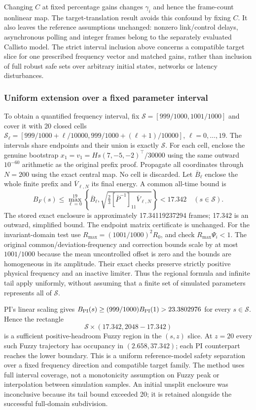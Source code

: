 Changing $C$ at fixed percentage gains changes $\gamma_i$ and hence
the frame-count nonlinear map. The target-translation result avoids
this confound by fixing $C$. It also leaves the reference assumptions
unchanged: nonzero link/control delays, asynchronous polling and
integer frames belong to the separately evaluated Callisto model.
The strict interval inclusion above concerns a compatible target
slice for one prescribed frequency vector and matched gains, rather
than inclusion of full robust safe sets over arbitrary initial
states, networks or latency disturbances.

\subsubsection{Uniform extension over a fixed parameter interval}
To obtain a quantified frequency interval, fix
$\mathcal S=[999/1000,1001/1000]$ and cover it with 20 closed cells
$\mathcal S_\ell=[999/1000+\ell/10000,
999/1000+(\ell+1)/10000]$, $\ell=0,\ldots,19$.
The intervals share endpoints and their union is exactly $\mathcal S$.
For each cell, enclose the genuine bootstrap
$x_1=v_1=Hs(7,-5,-2)^\top/30000$ using the same outward
$10^{-60}$ arithmetic as the original prefix proof. Propagate all
coordinates through $N=200$ using the exact central map. No cell is
discarded. Let $\overline B_\ell$ enclose the whole finite prefix
and $\overline V_{\ell,N}$ its final energy. A common all-time bound is
\begin{equation}
 B_F(s)\le\max_{\ell=0}^{19}
 \left\{\overline B_\ell,
 \sqrt{\tfrac23[\bar P^{-1}]_{11}\overline V_{\ell,N}}\right\}
 <17.342\quad(s\in\mathcal S).
 \label{detail:eq:btd_uniform_frequency_interval}
\end{equation}
The stored exact enclosure is approximately 17.34119237294 frames;
17.342 is an outward, simplified bound. The endpoint matrix
certificate is unchanged. For the invariant-domain test use
$R_{\max}=(1001/1000)^2R_0$, and check $R_{\max}\Psi_i<1$.
The original common/deviation-frequency and correction bounds scale
by at most $1001/1000$ because the mean uncontrolled offset is zero
and the bounds are homogeneous in its amplitude. Their exact checks
preserve strictly positive physical frequency and an inactive limiter.
Thus the regional formula and infinite tail apply uniformly, without
assuming that a finite set of simulated parameters represents all of
$\mathcal S$.

PI's linear scaling gives
$B_{\rm PI}(s)\ge(999/1000)B_{\rm PI}(1)>23.3802976$
for every $s\in\mathcal S$. Hence the rectangle
\[
 \mathcal S\times(17.342,2048-17.342)
\]
is a sufficient positive-headroom Fuzzy region in the $(s,z)$ slice.
At $z=20$ every such Fuzzy trajectory has occupancy in
$(2.658,37.342)$; each PI counterpart reaches the lower boundary.
This is a uniform reference-model safety separation over a fixed
frequency direction and compatible target family. The method uses
full interval coverage, not a monotonicity assumption on Fuzzy peak
or interpolation between simulation samples. An initial unsplit
enclosure was inconclusive because its tail bound exceeded 20; it
is retained alongside the successful full-domain subdivision.
